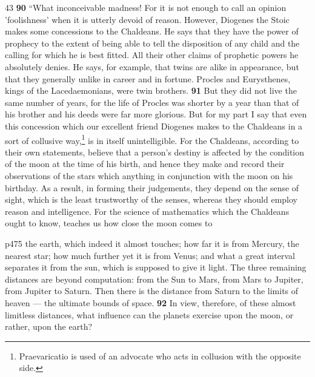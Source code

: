 43
\textbf{90} ``What inconceivable madness! For it is not enough to call an opinion 'foolishness' when it is utterly devoid of reason. However, Diogenes the Stoic makes some concessions to the Chaldeans. He says that they have the power of prophecy to the extent of being able to tell the disposition of any child and the calling for which he is best fitted. All their other claims of prophetic powers he absolutely denies. He says, for example, that twins are alike in appearance, but that they generally unlike in career and in fortune. Procles and Eurysthenes, kings of the Lacedaemonians, were twin brothers. \textbf{91} But they did not live the same number of years, for the life of Procles was shorter by a year than that of his brother and his deeds were far more glorious. But for my part I say that even this concession which our excellent friend Diogenes makes to the Chaldeans in a sort of collusive way,\texthebrew{}\footnote{Praevaricatio is used of an advocate who acts in collusion with the opposite side.

} is in itself unintelligible. For the Chaldeans, according to their own statements, believe that a person's destiny is affected by the condition of the moon at the time of his birth, and hence they make and record their observations of the stars which anything in conjunction with the moon on his birthday. As a result, in forming their judgements, they depend on the sense of sight, which is the least trustworthy of the senses, whereas they should employ reason and intelligence. For the science of mathematics which the Chaldeans ought to know, teaches us how close the moon comes to

p475 the earth, which indeed it almost touches; how far it is from Mercury, the nearest star; how much further yet it is from Venus; and what a great interval separates it from the sun, which is supposed to give it light. The three remaining distances are beyond computation: from the Sun to Mars, from Mars to Jupiter, from Jupiter to Saturn. Then there is the distance from Saturn to the limits of heaven \texthebrew{—} the ultimate bounds of space. \textbf{92} In view, therefore, of these almost limitless distances, what influence can the planets exercise upon the moon, or rather, upon the earth?

